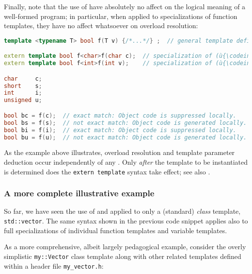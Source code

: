 Finally, note that the use of  have absolutely no affect on the logical meaning of a
well-formed program; in particular, when applied to specializations of
function templates, they have no affect whatsoever on overload
resolution:

\begin{lstlisting}[language=C++]
template <typename T> bool f(T v) {/*...*/} ;  // general template definition

extern template bool f<char>f(char c);  // specialization of (ù{\codeincomments{f}}ù) for (ù{\codeincomments{char}}ù)
extern template bool f<int>f(int v);    // specialization of (ù{\codeincomments{f}}ù) for (ù{\codeincomments{int}}ù)

char     c;
short    s;
int      i;
unsigned u;

bool bc = f(c);  // exact match: Object code is suppressed locally.
bool bs = f(s);  // not exact match: Object code is generated locally.
bool bi = f(i);  // exact match: Object code is suppressed locally.
bool bu = f(u);  // not exact match: Object code is generated locally.
\end{lstlisting}
    
\noindent As the example above illustrates, overload resolution and template
parameter deduction occur independently of any
. Only \emph{after}
the template to be instantiated is determined does the
\lstinline!extern!~\lstinline!template! syntax take effect; see also .

\subsubsection[A more complete illustrative example]{A more complete illustrative example}\label{a-more-complete-illustrative-example}

So far, we have seen the use of  and  applied to only a
(standard) \emph{class} template, \lstinline!std::vector!. The same syntax
shown in the previous code snippet applies also to full specializations of individual
function templates and variable templates. %

As a more comprehensive, albeit largely pedagogical example, consider
the overly simplistic \lstinline!my::Vector! class template along with
other related templates defined within a header file
\lstinline!my_vector.h!:

